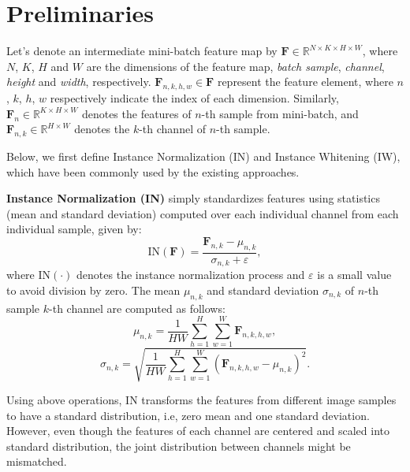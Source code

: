 \documentclass[10pt,twocolumn,letterpaper]{article}
\begin{document}
\section{Preliminaries}




Let's denote an intermediate mini-batch feature map by $\mathbf{F}\in\mathbb{R}^{N\times K\times H\times W}$, where $N$, $K$, $H$ and $W$ are the dimensions of the feature map, \ie \textit{batch sample}, \textit{channel}, \textit{height} and \textit{width}, respectively.
$\mathbf{F}_{n,k,h,w} \in \mathbf{F}$ represent the feature element, where $n$, $k$, $h$, $w$ respectively indicate the index of each dimension.
Similarly, $\mathbf{F}_{n}\in\mathbb{R}^{K\times H\times W}$ denotes the features of $n$-th sample from mini-batch, and $\mathbf{F}_{n,k}\in\mathbb{R}^{H\times W}$ denotes the $k$-th channel of $n$-th sample. 

Below, we first define Instance Normalization (IN) and Instance Whitening (IW), which have been commonly used by the existing approaches.












\textbf{Instance Normalization (IN)} simply standardizes features using statistics (\ie mean and standard deviation) computed over each individual channel from each individual sample, given by:
\begin{equation}
\mathrm{IN}(\mathbf{F})=\frac{\mathbf{F}_{n,k}-\mu_{n,k}}{\sigma_{n,k}+\varepsilon},
\end{equation}
where $\mathrm{IN}(\cdot)$ denotes the instance normalization process and $\varepsilon$ is a small value to avoid division by zero. The mean $\mu_{n,k}$ and standard deviation $\sigma_{n,k}$ of $n$-th sample $k$-th channel are computed as follows:
\vspace{-2mm}
\begin{equation}
\mu_{n,k}=\frac{1}{HW}\sum_{h=1}^{H}\sum_{w=1}^{W}\mathbf{F}_{n,k,h,w},
\end{equation}
\begin{equation}
\sigma_{n,k}=\sqrt{\frac{1}{HW}\sum_{h=1}^{H}\sum_{w=1}^{W}(\mathbf{F}_{n,k,h,w}-\mu_{n,k})^{2}}.
\end{equation}

Using above operations, IN transforms the features from different image samples to have a standard distribution, i.e, zero mean and one standard deviation. However, even though the features of each channel are centered and scaled into standard distribution, the joint distribution between channels might be mismatched.
\end{document}

